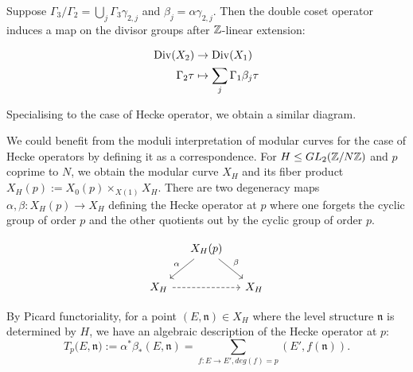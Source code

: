 Suppose $\Gamma_3 / \Gamma_2 = \bigcup_j \Gamma_3 \gamma_{2,j}$ and $\beta_j = \alpha \gamma_{2,j}$. Then the double coset operator induces a map on the divisor groups  after $\mathbb{Z}$-linear extension:

\begin{align*}
    \operatorname{Div}(X_2) &\rightarrow \operatorname{Div}(X_1) \\
    \Gamma_2 \tau &\mapsto \sum_j \Gamma_1 \beta_j \tau
\end{align*}

Specialising to the case of Hecke operator, we obtain a similar diagram. 

We could benefit from the moduli interpretation of modular curves for the case of Hecke operators by defining it as a correspondence. For $H \leq GL_2(\mathbb{Z}/N\mathbb{Z})$ and $p$ coprime to $N$, we obtain the modular curve $X_H$ and its fiber product $X_H(p) := X_0(p) \times_{X(1)} X_H$. There are two degeneracy maps $\alpha,\beta: X_H(p) \rightarrow X_H$ defining the Hecke operator at $p$ where one forgets the cyclic group of order $p$ and the other quotients out by the cyclic group of order $p$.


\[
\begin{tikzcd}[column sep=small]
 & X_H(p) \arrow{dl}[swap]{\alpha} \arrow{dr}{\beta} & \\
X_H \arrow[rr,dashed] & & X_H
\end{tikzcd}
\]

By Picard functoriality, for a point $(E,\mathfrak{n}) \in X_H$ where the level structure $\mathfrak{n}$ is determined by $H$, we have an algebraic description of the Hecke operator at $p$: \[T_p(E,\mathfrak{n)} := \alpha^* \beta_* (E,\mathfrak{n}) = \sum_{f:E\rightarrow E', deg(f) = p} (E',f(\mathfrak{n})).\]


